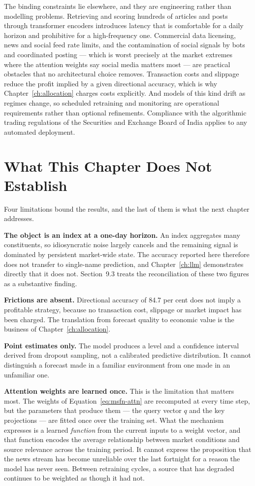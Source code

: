 The binding constraints lie elsewhere, and they are engineering rather than modelling problems.
Retrieving and scoring hundreds of articles and posts through transformer encoders introduces
latency that is comfortable for a daily horizon and prohibitive for a high-frequency one.
Commercial data licensing, news and social feed rate limits, and the contamination of social
signals by bots and coordinated posting --- which is worst precisely at the market extremes where
the attention weights say social media matters most --- are practical obstacles that no
architectural choice removes. Transaction costs and slippage reduce the profit implied by a given
directional accuracy, which is why Chapter~\ref{ch:allocation} charges costs explicitly. And
models of this kind drift as regimes change, so scheduled retraining and monitoring are
operational requirements rather than optional refinements. Compliance with the algorithmic
trading regulations of the Securities and Exchange Board of India applies to any automated
deployment.

\section{What This Chapter Does Not Establish}
\label{sec:msfn-limits}

Four limitations bound the results, and the last of them is what the next chapter addresses.

\textbf{The object is an index at a one-day horizon.} An index aggregates many constituents, so
idiosyncratic noise largely cancels and the remaining signal is dominated by persistent
market-wide state. The accuracy reported here therefore does not transfer to single-name
prediction, and Chapter~\ref{ch:llm} demonstrates directly that it does not. Section~9.3 treats
the reconciliation of these two figures as a substantive finding.

\textbf{Frictions are absent.} Directional accuracy of 84.7 per cent does not imply a profitable
strategy, because no transaction cost, slippage or market impact has been charged. The
translation from forecast quality to economic value is the business of
Chapter~\ref{ch:allocation}.

\textbf{Point estimates only.} The model produces a level and a confidence interval derived from
dropout sampling, not a calibrated predictive distribution. It cannot distinguish a forecast made
in a familiar environment from one made in an unfamiliar one.

\textbf{Attention weights are learned once.} This is the limitation that matters most. The
weights of Equation~\eqref{eq:msfn-attn} are recomputed at every time step, but the parameters
that produce them --- the query vector $q$ and the key projections --- are fitted once over the
training set. What the mechanism expresses is a learned \emph{function} from the current inputs
to a weight vector, and that function encodes the average relationship between market conditions
and source relevance across the training period. It cannot express the proposition that the news
stream has become unreliable over the last fortnight for a reason the model has never seen.
Between retraining cycles, a source that has degraded continues to be weighted as though it had
not.

